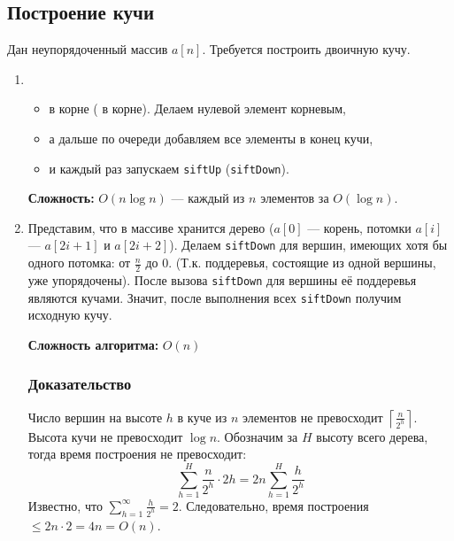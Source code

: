 \subsection*{Построение кучи}
Дан неупорядоченный массив $a[n]$.
Требуется построить двоичную кучу.
\begin{enumerate}
	\item
\begin{itemize}
	\item {} в корне ( в корне). Делаем нулевой элемент корневым,
	\item а дальше по очереди добавляем все элементы в конец кучи,
	\item и каждый раз запускаем \texttt{siftUp} (\texttt{siftDown}).
\end{itemize}
\textbf{Сложность:} $O(n \log n)$ --- каждый из $n$ элементов за $O(\log n)$.
\item

Представим, что в массиве хранится дерево ($a[0]$ --- корень, потомки $a[i]$ --- $a[2i+1]$ и $a[2i+2]$).
Делаем \texttt{siftDown} для вершин, имеющих хотя бы одного потомка: от $\frac{n}{2}$ до $0$.
(Т.к. поддеревья, состоящие из одной вершины, уже упорядочены).
После вызова \texttt{siftDown} для вершины её поддеревья являются кучами.
Значит, после выполнения всех \texttt{siftDown} получим исходную кучу.

\textbf{Сложность алгоритма:} $O(n)$

\subsubsection*{Доказательство}
Число вершин на высоте $h$ в куче из $n$ элементов не превосходит $\left\lceil \frac{n}{2^h} \right\rceil$. Высота кучи не превосходит $\log n$.
Обозначим за $H$ высоту всего дерева, тогда время построения не превосходит:
$$ \sum_{h=1}^H \frac{n}{2^h} \cdot 2h = 2n \sum_{h=1}^H \frac{h}{2^h} $$
Известно, что $\displaystyle \sum_{h=1}^\infty \frac{h}{2^h} = 2$.
Следовательно, время построения $\le 2n \cdot 2 = 4n = O(n)$.

\end{enumerate}
